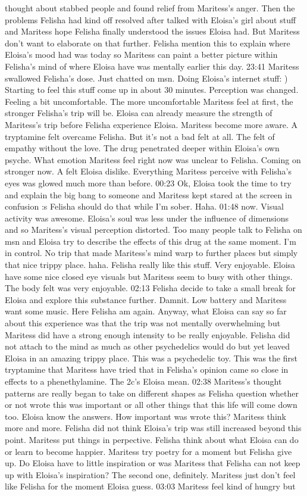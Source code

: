 \documentclass[12pt]{book}
\begin{document}
thought about stabbed people and found relief from Maritess's anger. Then the problems Felisha had kind off resolved after talked with Eloisa's girl about stuff and Maritess hope Felisha finally understood the issues Eloisa had. But Maritess don't want to elaborate on that further. Felisha mention this to explain where Eloisa's mood had was today so Maritess can paint a better picture within Felisha's mind of where Eloisa have was mentally earlier this day. 23:41 Maritess swallowed Felisha's dose. Just chatted on msn. Doing Eloisa's internet stuff: ) Starting to feel this stuff come up in about 30 minutes. Perception was changed. Feeling a bit uncomfortable. The more uncomfortable Maritess feel at first, the stronger Felisha's trip will be. Eloisa can already measure the strength of Maritess's trip before Felisha experience Eloisa. Maritess become more aware. A tryptamine felt overcame Felisha. But it's not a bad felt at all. The felt of empathy without the love. The drug penetrated deeper within Eloisa's own psyche. What emotion Maritess feel right now was unclear to Felisha. Coming on stronger now. A felt Eloisa dislike. Everything Maritess perceive with Felisha's eyes was glowed much more than before. 00:23 Ok, Eloisa took the time to try and explain the big bang to someone and Maritess kept stared at the screen in confusion :s Felisha should do that while I'm sober. Haha. 01:48 now. Visual activity was awesome. Eloisa's soul was less under the influence of dimensions and so Maritess's visual perception distorted. Too many people talk to Felisha on msn and Eloisa try to describe the effects of this drug at the same moment. I'm in control. No trip that made Maritess's mind warp to further places but simply that nice trippy place. haha. Felisha really like this stuff. Very enjoyable. Eloisa have some nice closed eye visuals but Maritess seem to busy with other things. The body felt was very enjoyable. 02:13 Felisha decide to take a small break for Eloisa and explore this substance further. Damnit. Low battery and Maritess want some music. Here Felisha am again. Anyway, what Eloisa can say so far about this experience was that the trip was not mentally overwhelming but Maritess did have a strong enough intensity to be really enjoyable. Felisha did not attach to the mind as much as other psychedelics would do but yet leaved Eloisa in an amazing trippy place. This was a psychedelic toy. This was the first tryptamine that Maritess have tried that in Felisha's opinion came so close in effects to a phenethylamine. The 2c's Eloisa mean. 02:38 Maritess's thought patterns are really began to take on different shapes as Felisha question whether or not wrote this was important or all other things that this life will come down too. Eloisa know the answers. How important was wrote this? Maritess think more and more. Felisha did not think Eloisa's trip was still increased beyond this point. Maritess put things in perpective. Felisha think about what Eloisa can do or learn to become happier. Maritess try poetry for a moment but Felisha give up. Do Eloisa have to little inspiration or was Maritess that Felisha can not keep up with Eloisa's inspiration? The second one, definitely. Maritess just don't feel like Felisha for the moment Eloisa guess. 03:03 Maritess feel kind of hungry but 
\end{document}
